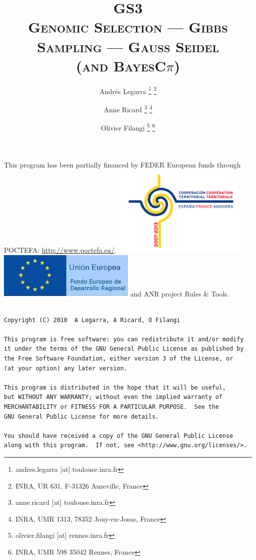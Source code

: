 \documentclass[a4paper,12pt,titlepage]{article}      %
\title{\textsc{ {\Huge GS3} \\ 
{\normalsize Genomic Selection --- Gibbs Sampling --- Gauss Seidel  \\
(and BayesC$\pi$) }
}
}  %
\author{
	Andr\'es Legarra \thanks{\ttfamily andres.legarra [at] toulouse.inra.fr }
										\thanks{INRA, UR 631, F-31326 Auzeville, France }      
	\and Anne Ricard \thanks{\ttfamily anne.ricard [at] toulouse.inra.fr }
										\thanks{        INRA, UMR 1313, 78352 Jouy-en-Josas, France }
	\and Olivier Filangi \thanks{\ttfamily olivier.filangi [at] rennes.inra.fr }
												\thanks{INRA, UMR 598 35042 Rennes, France }
}
\begin{document}

\maketitle                   %

\newpage
{\large
This program has been partially financed by FEDER European funds through POCTEFA: \url{http://www.poctefa.eu/}. }
\includegraphics[width=0.5\textwidth]{logo_cooperaci_n_01.jpg}
\includegraphics[width=0.5\textwidth]{logo_europa_fondos_feder_01.jpg}
and ANR project Rules \& Tools.

\newpage




{\footnotesize
\begin{verbatim}

Copyright (C) 2010  A Legarra, A Ricard, O Filangi

This program is free software: you can redistribute it and/or modify
it under the terms of the GNU General Public License as published by
the Free Software Foundation, either version 3 of the License, or
(at your option) any later version.

This program is distributed in the hope that it will be useful,
but WITHOUT ANY WARRANTY; without even the implied warranty of
MERCHANTABILITY or FITNESS FOR A PARTICULAR PURPOSE.  See the
GNU General Public License for more details.

You should have received a copy of the GNU General Public License
along with this program.  If not, see <http://www.gnu.org/licenses/>.
\end{verbatim}
}
\end{document}
